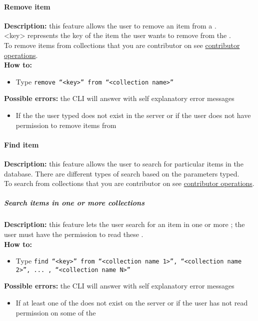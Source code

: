 \documentclass{scalatekids-article}
\begin{document}
\paragraph{Remove item}
\label{sec:removeitem}
\textbf{Description:} this feature allows the user to remove an item from a .\\
<key> represents the key of the item the user wants to remove from the .\\
To remove items from collections that you are contributor on see \hyperref[sec:contributoroperations]{contributor operations}.\\
\textbf{How to:}
\begin{itemize}
\item Type \texttt{remove ``<key>'' from ``<collection name>''}
\end{itemize}
\textbf{Possible errors:} the CLI will answer with self explanatory error messages
\begin{itemize}
\item If the  the user typed does not exist in the server or if the user does not have permission to remove items from
\end{itemize}

\paragraph{Find item}
\label{sec:find}
\textbf{Description:} this feature allows the user to search for particular items in the database. There are different types of search based on the parameters typed.\\
To search from collections that you are contributor on see \hyperref[sec:contributoroperations]{contributor operations}.\\

\subparagraph{Search items in one or more collections}
\textbf{Description:} this feature lets the user search for an item in one or more ; 
the user must have the permission to read these .\\
\textbf{How to:}
\begin{itemize}
\item Type \texttt{find ``<key>'' from ``<collection name 1>'', ``<collection name 2>'', ... , ``<collection name N>''}
\end{itemize}
\textbf{Possible errors:} the CLI will answer with self explanatory error messages
\begin{itemize}
\item If at least one of the  does not exist on the server or if the user has not read permission on some of the 
\end{itemize}
\end{document}
